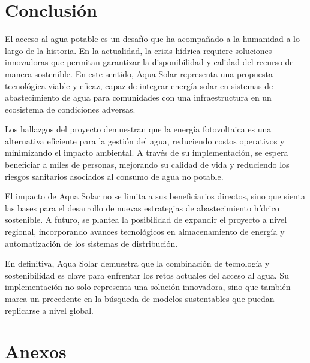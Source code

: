 \documentclass[12pt]{article}
\begin{document}
\newpage
\section{Conclusión}
El acceso al agua potable es un desafío que ha acompañado a la humanidad a lo largo de la historia. En la actualidad, la crisis hídrica requiere soluciones innovadoras que permitan garantizar la disponibilidad y calidad del recurso de manera sostenible. En este sentido, Aqua Solar representa una propuesta tecnológica viable y eficaz, capaz de integrar energía solar en sistemas de abastecimiento de agua para comunidades con una infraestructura en un ecosistema de condiciones adversas.

Los hallazgos del proyecto demuestran que la energía fotovoltaica es una alternativa eficiente para la gestión del agua, reduciendo costos operativos y minimizando el impacto ambiental. A través de su implementación, se espera beneficiar a miles de personas, mejorando su calidad de vida y reduciendo los riesgos sanitarios asociados al consumo de agua no potable.

El impacto de Aqua Solar no se limita a sus beneficiarios directos, sino que sienta las bases para el desarrollo de nuevas estrategias de abastecimiento hídrico sostenible. A futuro, se plantea la posibilidad de expandir el proyecto a nivel regional, incorporando avances tecnológicos en almacenamiento de energía y automatización de los sistemas de distribución.

En definitiva, Aqua Solar demuestra que la combinación de tecnología y sostenibilidad es clave para enfrentar los retos actuales del acceso al agua. Su implementación no solo representa una solución innovadora, sino que también marca un precedente en la búsqueda de modelos sustentables que puedan replicarse a nivel global.


\newpage
\nocite{*}
\newpage
\section{Anexos}
\end{document}
